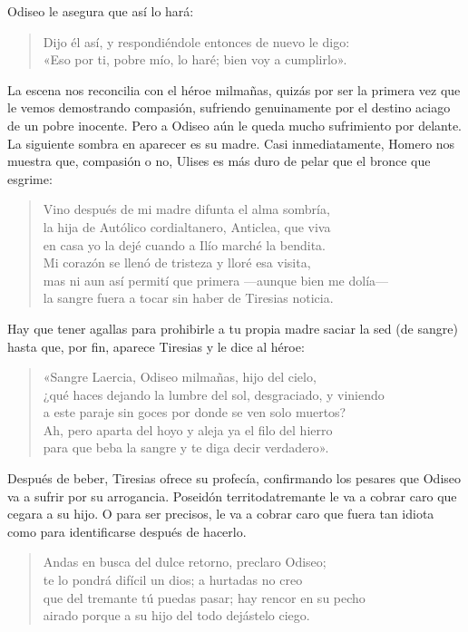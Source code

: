 \documentclass[11pt,a4paper]{article}
\begin{document}
Odiseo le asegura que así lo hará:

\begin{verse}
Dijo él así, y respondiéndole entonces de nuevo le digo:\\
«Eso por ti, pobre mío, lo haré; bien voy a cumplirlo».
\end{verse}

La escena nos reconcilia con el héroe milmañas, quizás por ser la primera vez que le vemos demostrando compasión, sufriendo genuinamente por el destino aciago de un pobre inocente. Pero a Odiseo aún le queda mucho sufrimiento por delante. La siguiente sombra en aparecer es su madre. Casi inmediatamente, Homero nos muestra que, compasión o no, Ulises es más duro de pelar que el bronce que esgrime:

\begin{verse}
Vino después de mi madre difunta el alma sombría,\\
la hija de Autólico cordialtanero, Anticlea, que viva\\
en casa yo la dejé cuando a Ilío marché la bendita.\\
Mi corazón se llenó de tristeza y lloré esa visita,\\
mas ni aun así permití que primera ---aunque bien me dolía---\\
la sangre fuera a tocar sin haber de Tiresias noticia.
\end{verse}

Hay que tener agallas para prohibirle a tu propia madre saciar la sed (de sangre) hasta que, por fin, aparece Tiresias y le dice al héroe:

\begin{verse}
«Sangre Laercia, Odiseo milmañas, hijo del cielo,\\
¿qué haces dejando la lumbre del sol, desgraciado, y viniendo\\
a este paraje sin goces por donde se ven solo muertos?\\
Ah, pero aparta del hoyo y aleja ya el filo del hierro\\
para que beba la sangre y te diga decir verdadero».
\end{verse}

Después de beber, Tiresias ofrece su profecía, confirmando los pesares que Odiseo va a sufrir por su arrogancia. Poseidón territodatremante le va a cobrar caro que cegara a su hijo. O para ser precisos, le va a cobrar caro que fuera tan idiota como para identificarse después de hacerlo.

\begin{verse}
Andas en busca del dulce retorno, preclaro Odiseo;\\
te lo pondrá difícil un dios; a hurtadas no creo\\
que del tremante tú puedas pasar; hay rencor en su pecho\\
airado porque a su hijo del todo dejástelo ciego.
\end{verse}
\end{document}
